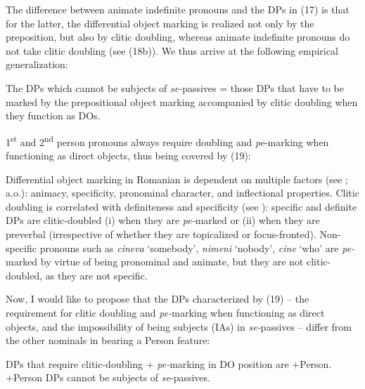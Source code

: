 \documentclass[output=paper]{langsci/langscibook}
\begin{document}
The difference between animate indefinite pronouns and the DPs in (17) is that for the latter, the differential object marking is realized not only by the preposition, but also by clitic doubling, whereas animate indefinite pronouns do not take clitic doubling (see (18b)). We thus arrive at the following empirical generalization:

\ea%
    \label{ex:giurgea:19}
    The DPs which cannot be subjects of \textit{se-}passives = those DPs that have to be marked by the prepositional object marking accompanied by clitic doubling when they function as DOs.
\z

1\textsuperscript{st} and 2\textsuperscript{nd} person pronouns always require doubling and \textit{pe}{}-marking when functioning as direct objects, thus being covered by (19):

\ea%
    \label{ex:giurgea:20}
    \z
\z

Differential object marking in Romanian is dependent on multiple factors (see \citealt{Dobrovie-Sorin1994,Cornilescu2000,Mardale2008,Tigău2010,Tigău2014}; a.o.): animacy, specificity, pronominal character, and inflectional properties. Clitic doubling is correlated with definiteness and specificity (see \citealt{Marchis2013}): specific and definite DPs are clitic-doubled (i) when they are \textit{pe-}marked or (ii) when they are preverbal (irrespective of whether they are topicalized or focus-fronted). Non-specific pronouns such as \textit{cineva} ‘somebody’, \textit{nimeni} ‘nobody’, \textit{cine} ‘who’ are \textit{pe-}marked by virtue of being pronominal and animate, but they are not clitic-doubled, as they are not specific.

Now, I would like to propose that the DPs characterized by (19) – the requirement for clitic doubling and \textit{pe-}marking when functioning as direct objects, and the impossibility of being subjects (IAs) in \textit{se-}passives – differ from the other nominals in bearing a Person feature:

\ea%
    \label{ex:giurgea:21}
    \ea DPs that require clitic-doubling + \textit{pe-}marking in DO position are +Person.
      \ex +Person DPs cannot be subjects of \textit{se}{}-passives.
    \z
\z
\end{document}
